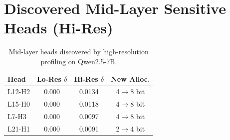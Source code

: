 \documentclass[11pt,a4paper]{article}
\begin{document}
\section{Discovered Mid-Layer Sensitive Heads (Hi-Res)}
\label{app:hires_heads}

\begin{table}[h]
\centering
\small
\caption{Mid-layer heads discovered by high-resolution profiling on Qwen2.5-7B.}
\begin{tabular}{lccc}
\toprule
\textbf{Head} & \textbf{Lo-Res $\delta$} & \textbf{Hi-Res $\delta$} & \textbf{New Alloc.} \\
\midrule
L12-H2 & 0.000 & 0.0134 & 4$\to$8 bit \\
L15-H0 & 0.000 & 0.0118 & 4$\to$8 bit \\
L7-H3 & 0.000 & 0.0097 & 4$\to$8 bit \\
L21-H1 & 0.000 & 0.0091 & 2$\to$4 bit \\
\bottomrule
\end{tabular}
\end{table}
\end{document}
